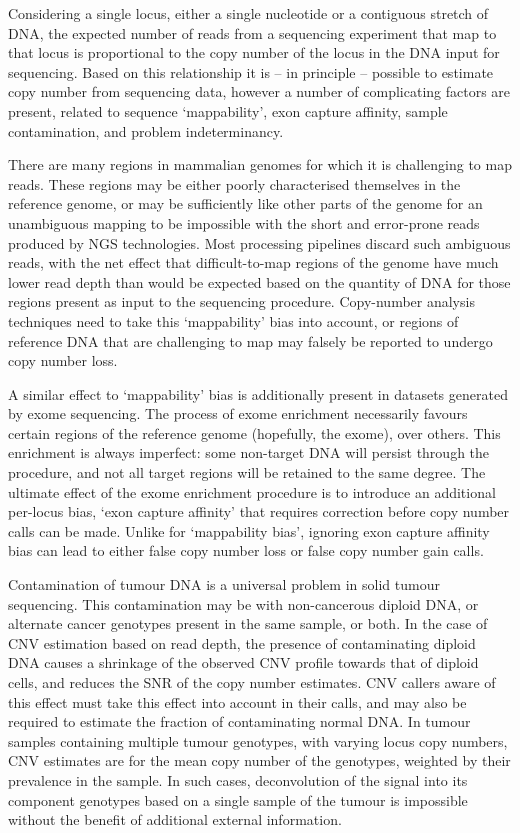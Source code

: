 \documentclass[thesis.tex]{subfiles}
\begin{document}
Considering a single locus, either a single nucleotide or a contiguous stretch of DNA, the expected number of reads from a sequencing experiment that map to that locus is proportional to the copy number of the locus in the DNA input for sequencing.  Based on this relationship it is -- in principle -- possible to estimate copy number from sequencing data, however a number of complicating factors are present, related to sequence `mappability', exon capture affinity, sample contamination, and problem indeterminancy.

There are many regions in mammalian genomes for which it is challenging to map reads.  These regions may be either poorly characterised themselves in the reference genome, or may be sufficiently like other parts of the genome for an unambiguous mapping to be impossible with the short and error-prone reads produced by \gls{NGS} technologies.  Most processing pipelines discard such ambiguous reads, with the net effect that difficult-to-map regions of the genome have much lower read depth than would be expected based on the quantity of DNA for those regions present as input to the sequencing procedure.  Copy-number analysis techniques need to take this `mappability' bias into account, or regions of reference DNA that are challenging to map may falsely be reported to undergo copy number loss.

A similar effect to `mappability' bias is additionally present in datasets generated by exome sequencing.  The process of exome enrichment necessarily favours certain regions of the reference genome (hopefully, the exome), over others.  This enrichment is always imperfect: some non-target DNA will persist through the procedure, and not all target regions will be retained to the same degree.  The ultimate effect of the exome enrichment procedure is to introduce an additional per-locus bias, `exon capture affinity' that requires correction before copy number calls can be made.  Unlike for `mappability bias', ignoring exon capture affinity bias can lead to either false copy number loss or false copy number gain calls.

Contamination of tumour DNA is a universal problem in solid tumour sequencing.  This contamination may be with non-cancerous diploid DNA, or alternate cancer genotypes present in the same sample, or both.  In the case of \gls{CNV} estimation based on read depth, the presence of contaminating diploid DNA causes a shrinkage of the observed \gls{CNV} profile towards that of diploid cells, and reduces the \gls{SNR} of the copy number estimates.  \gls{CNV} callers aware of this effect must take this effect into account in their calls, and may also be required to estimate the fraction of contaminating normal DNA.  In tumour samples containing multiple tumour genotypes, with varying locus copy numbers, \gls{CNV} estimates are for the mean copy number of the genotypes, weighted by their prevalence in the sample.  In such cases, deconvolution of the signal into its component genotypes based on a single sample of the tumour is impossible without the benefit of additional external information.
\end{document}
